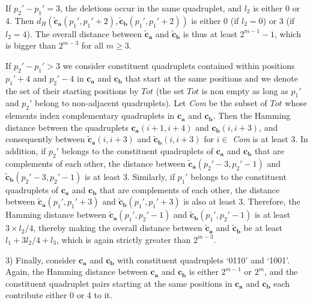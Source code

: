 If $p_2'-p_1'=3$, the deletions occur in the same quadruplet, and
$l_2$ is either 0 or 4. Then
$d_H\left(\mathbf{\tilde{c}_a}(p_1',p_1'+2),\mathbf{\tilde{c}_b}(p_1',p_1'+2)\right)$
is either 0 (if $l_2 = 0$) or 3 (if $l_2 = 4$). The overall
distance between $\mathbf{\tilde{c}_a}$ and $\mathbf{\tilde{c}_b}$
is thus at least $2^{m-1}-1$, which is bigger than $2^{m-3}$ for
all $m \geq 3$.

If $p_2'-p_1'>3$ we consider constituent quadruplets contained
within positions $p_1'+4$ and $p_2'-4$ in $\mathbf{c_a}$ and
$\mathbf{c_b}$ that start at the same positions and we denote the
set of their starting positions by $Tot$ (the set $Tot$ is non
empty as long as $p_1'$ and $p_2'$ belong to non-adjacent
quadruplets). Let \textit{Com} be the subset of $Tot$ whose
elements index complementary quadruplets in $\mathbf{c_a}$ and
$\mathbf{c_b}$. Then the Hamming distance between the quadruplets
$\mathbf{c_a}(i+1,i+4)$ and $\mathbf{c_b}(i,i+3)$, and
consequently between $\mathbf{\tilde{c}_a}(i,i+3)$ and
$\mathbf{\tilde{c}_b}(i,i+3)$ for $i \in$ \textit{Com} is at least
3. In addition, if $p_2'$ belongs to the constituent quadruplets
of $\mathbf{c_a}$ and $\mathbf{c_b}$ that are complements of each
other, the distance between $\mathbf{\tilde{c}_a}(p_2'-3,p_2'-1)$
and $\mathbf{\tilde{c}_b}(p_2'-3,p_2'-1)$ is at least 3.
Similarly, if $p_1'$ belongs to the constituent quadruplets of
$\mathbf{c_a}$ and $\mathbf{c_b}$ that are complements of each
other, the distance between $\mathbf{\tilde{c}_a}(p_1',p_1'+3)$
and $\mathbf{\tilde{c}_b}(p_1',p_1'+3)$ is also at least 3.
Therefore, the Hamming distance between
$\mathbf{\tilde{c}_a}(p_1',p_2'-1)$ and
$\mathbf{\tilde{c}_b}(p_1',p_2'-1)$ is at least $3\times l_2/4$,
thereby making the overall distance between $\mathbf{\tilde{c}_a}$
and $\mathbf{\tilde{c}_b}$ be at least $l_1+3l_2/4+l_3$, which is
again strictly greater than $2^{m-3}$.




3) Finally, consider $\mathbf{c_a}$ and $\mathbf{c_b}$ with
constituent quadruplets `0110' and `1001'. Again, the Hamming
distance between $\mathbf{c_a}$ and $\mathbf{c_b}$ is either
$2^{m-1}$ or $2^m$, and the constituent quadruplet pairs starting
at the same positions in $\mathbf{c_a}$ and $\mathbf{c_b}$ each
contribute either 0 or 4 to it.


